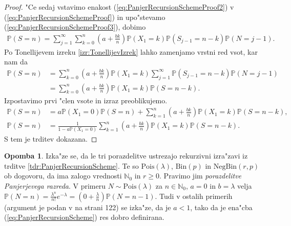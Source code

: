 \documentclass[12pt, a4paper, reqno]{amsart}
\theoremstyle{definition}
\newtheorem{opomba}[definicija]{Opomba}
\theoremstyle{plain}
\newcommand{\N}{\mathbb{N}}
\newcommand{\Prob}{\mathbb{P}}
\newcommand{\1}{\mathds{1}}
\newcommand{\Pois}[1]{\text{Pois}(#1)}
\newcommand*{\refPriloga}[1]{%
  \begingroup
    \hypersetup{
      linkcolor=red,
      linkbordercolor=red,
    }%
    \ref{#1}%
  \endgroup
}
\begin{document}
\begin{proof}
        \pagebreak
        \noindent
        "Ce sedaj vstavimo enakost (\ref{eq:PanjerRecursionSchemeProof2}) v (\ref{eq:PanjerRecursionSchemeProof}) 
        in upo"stevamo (\ref{eq:PanjerRecursionSchemeProof3}), dobimo
        \begin{align*}
            \Prob\left(S = n\right) 
                = \sum_{j = 1}^\infty\sum_{k = 0}^n \left(a + \frac{bk}{n}\right)\Prob\left(X_1 = k\right)\Prob\left(S_{j - 1} = n - k\right)\Prob\left(N = j - 1\right).
        \end{align*}
        Po Tonellijevem izreku \refPriloga{izr:TonellijevIzrek} lahko zamenjamo vrstni red vsot, kar nam da
        \begin{align*}
            \Prob(S = n) 
                &= \sum_{k = 0}^n\left(a + \frac{bk}{n}\right)\Prob\left(X_1 = k\right)\sum_{j = 1}^\infty\Prob\left(S_{j - 1} = n - k\right)\Prob\left(N = j - 1\right)\\
                &= \sum_{k = 0}^n\left(a + \frac{bk}{n}\right)\Prob\left(X_1 = k\right)\Prob\left(S = n - k\right).
        \end{align*}
        Izpostavimo prvi "clen vsote in izraz preoblikujemo.
        \begin{align*}
            \Prob\left(S = n\right) 
                &= a\Prob\left(X_1 = 0\right)\Prob\left(S = n\right) + \sum_{k = 1}^n\left(a + \frac{bk}{n}\right)\Prob\left(X_1 = k\right)\Prob\left(S = n - k\right), \\
            \Prob\left(S = n\right)
                &= \frac{1}{1 - a\Prob\left(X_1 = 0\right)}\sum_{k = 1}^n\left(a + \frac{bk}{n}\right)\Prob\left(X_1 = k\right)\Prob\left(S = n - k\right).
        \end{align*}
        S tem je trditev dokazana.
    \end{proof}

    \begin{opomba}
        Izka"ze se, da le tri porazdelitve 
        ustrezajo rekurzivni izra"zavi iz trditve \ref{tdr:PanjerRecursionScheme}. Te so $\Pois{\lambda}$, $\text{Bin}(p)$ in
        $\text{NegBin}(r, p)$ ob dogovoru, da ima zalogo vrednosti $\N_0$ in $r\geq0$. Pravimo jim \textit{porazdelitve Panjerjevega razreda}. 
        V primeru $N\sim\Pois{\lambda}$ za $n\in\N_0$, $a = 0$ in $b = \lambda$ velja $\Prob\left(N = n\right) = \frac{\lambda^n}{n!}e^{-\lambda} = 
        \left(0 + \frac{\lambda}{n}\right)\Prob\left(N = n - 1\right)$. 
        Tudi v ostalih primerih (argument je podan v \cite{4} na strani 122) se izka"ze, da je $a < 1$, tako da je 
        ena"cba (\ref{eq:PanjerRecursionScheme}) res dobro definirana.
        \label{op:PanjerRazsiritev}
    \end{opomba}
\end{document}
